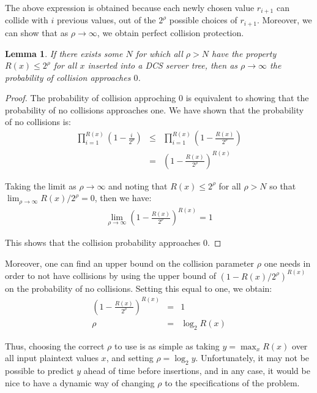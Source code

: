 \documentclass[12pt]{article}
\newtheorem{lemma}{Lemma}
\begin{document}
The above expression is obtained because each newly chosen value $r_{i+1}$ can collide with $i$ previous values, out of the $2^{\rho}$ possible choices of $r_{i+1}$. Moreover, we can show that as $\rho \to \infty$, we obtain perfect collision protection. \\

\begin{lemma}
  If there exists some $N$ for which all $\rho > N$ have the property $R(x) \leq 2^{\rho}$ for all $x$ inserted into a DCS server tree, then as $\rho \to \infty$ the probability of collision approaches $0$.
\end{lemma}
\begin{proof}
  The probability of collision approching 0 is equivalent to showing that the probability of no collisions approaches one. We have shown that the probability of no collisions is:
  \begin{eqnarray}
    \prod_{i=1}^{R(x)} \left(1 - \frac{i}{2^{\rho}} \right) &\leq& \prod_{i=1}^{R(x)} \left(1 - \frac{R(x)}{2^{\rho}} \right) \\
                                                    &=& \left(1 - \frac{R(x)}{2^{\rho}} \right)^{R(x)}
  \end{eqnarray}

  Taking the limit as $\rho \to \infty$ and noting that $R(x) \leq 2^{\rho}$ for all $\rho > N$ so that $\lim_{\rho \to \infty} R(x) / 2^{\rho} = 0$, then we have:
  \begin{eqnarray}
    \lim_{\rho \to \infty} \left(1 - \frac{R(x)}{2^{\rho}} \right)^{R(x)} = 1
  \end{eqnarray}

  This shows that the collision probability approaches 0.
\end{proof}

Moreover, one can find an upper bound on the collision parameter $\rho$ one needs in order to not have collisions by using the upper bound of $(1 - R(x)/2^{\rho})^{R(x)}$ on the probability of no collisions. Setting this equal to one, we obtain:
\begin{eqnarray}
  \left(1 - \frac{R(x)}{2^{\rho}} \right)^{R(x)} &=& 1 \\
                                            \rho &=& \log_2 R(x)
\end{eqnarray}

Thus, choosing the correct $\rho$ to use is as simple as taking $y = \max_x R(x)$ over all input plaintext values $x$, and setting $\rho = \log_2 y$. Unfortunately, it may not be possible to predict $y$ ahead of time before insertions, and in any case, it would be nice to have a dynamic way of changing $\rho$ to the specifications of the problem.
\end{document}
